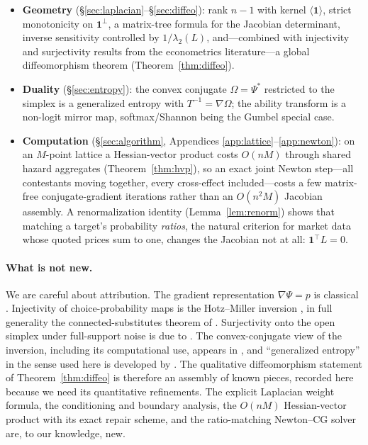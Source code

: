 \documentclass[11pt]{article}
\theoremstyle{definition}
\theoremstyle{remark}
\newcommand{\one}{\mathbf{1}}
\newcommand{\perpone}{\one^{\perp}}
\begin{document}
\begin{itemize}
  \item \textbf{Geometry} (\S\ref{sec:laplacian}--\S\ref{sec:diffeo}): rank
    $n-1$ with kernel $\langle\one\rangle$, strict monotonicity on
    $\perpone$, a matrix-tree formula for the Jacobian determinant, inverse
    sensitivity controlled by $1/\lambda_2(L)$, and---combined with
    injectivity and surjectivity results from the econometrics
    literature---a global diffeomorphism theorem
    (Theorem~\ref{thm:diffeo}).
  \item \textbf{Duality} (\S\ref{sec:entropy}): the convex conjugate
    $\Omega = \Psi^*$ restricted to the simplex is a generalized entropy
    with $T^{-1} = \nabla \Omega$; the ability transform is a non-logit
    mirror map, softmax/Shannon being the Gumbel special case.
  \item \textbf{Computation} (\S\ref{sec:algorithm}, Appendices
    \ref{app:lattice}--\ref{app:newton}): on an $M$-point lattice a
    Hessian-vector product costs $O(nM)$ through shared hazard aggregates
    (Theorem~\ref{thm:hvp}), so an exact joint Newton step---all
    contestants moving together, every cross-effect included---costs a few
    matrix-free conjugate-gradient iterations rather than an
    $O(n^2 M)$ Jacobian assembly.  A renormalization identity
    (Lemma~\ref{lem:renorm}) shows that matching a target's probability
    \emph{ratios}, the natural criterion for market data whose quoted
    prices sum to one, changes the Jacobian not at all: $\one^\top L = 0$.
\end{itemize}

\paragraph{What is not new.}
We are careful about attribution.  The gradient representation
$\nabla\Psi = p$ is classical \parencite{mcfadden1981}.  Injectivity of
choice-probability maps is the Hotz--Miller inversion
\parencite{hotzmiller1993}, in full generality the connected-substitutes
theorem of \textcite{berrygandhihaile2013}.  Surjectivity onto the open
simplex under full-support noise is due to
\textcite{noretstakahashi2013}.  The convex-conjugate view of the inversion,
including its computational use, appears in
\textcite{chiong2016}, and ``generalized entropy'' in the sense used here is
developed by \textcite{fosgerau2020}.  The qualitative diffeomorphism
statement of Theorem~\ref{thm:diffeo} is therefore an assembly of known
pieces, recorded here because we need its quantitative refinements.  The
explicit Laplacian weight formula, the conditioning and boundary analysis,
the $O(nM)$ Hessian-vector product with its exact repair scheme, and the
ratio-matching Newton--CG solver are, to our knowledge, new.
\end{document}
